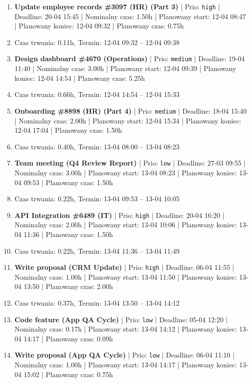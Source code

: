{\begin{enumerate}
  \item [\textbf{14621}] \textbf{Update employee records \#3097 (HR) (Part 3)} | Prio: \texttt{high} | Deadline: 20-04 15:45 | Nominalny czas: 1.50h | Planowany start: 12-04 08:47 | Planowany koniec: 12-04 09:32 | Planowany czas: 0.75h
  \item [\textbf{PRZERWA}] Czas trwania: 0.11h, Termin: 12-04 09:32 -- 12-04 09:38
  \item [\textbf{14676}] \textbf{Design dashboard \#4670 (Operations)} | Prio: \texttt{medium} | Deadline: 19-04 11:40 | Nominalny czas: 3.00h | Planowany start: 12-04 09:39 | Planowany koniec: 12-04 14:54 | Planowany czas: 5.25h
  \item [\textbf{PRZERWA}] Czas trwania: 0.66h, Termin: 12-04 14:54 -- 12-04 15:33
  \item [\textbf{14636}] \textbf{Onboarding \#8898 (HR) (Part 4)} | Prio: \texttt{medium} | Deadline: 18-04 15:40 | Nominalny czas: 2.00h | Planowany start: 12-04 15:34 | Planowany koniec: 12-04 17:04 | Planowany czas: 1.50h
  \item [\textbf{PRZERWA}] Czas trwania: 0.40h, Termin: 13-04 08:00 -- 13-04 08:23
  \item [\textbf{14682}] \textbf{Team meeting (Q4 Review Report)} | Prio: \texttt{low} | Deadline: 27-03 09:55 | Nominalny czas: 3.00h | Planowany start: 13-04 08:23 | Planowany koniec: 13-04 09:53 | Planowany czas: 1.50h
  \item [\textbf{PRZERWA}] Czas trwania: 0.22h, Termin: 13-04 09:53 -- 13-04 10:05
  \item [\textbf{14620}] \textbf{API Integration \#6489 (IT)} | Prio: \texttt{high} | Deadline: 20-04 16:20 | Nominalny czas: 2.00h | Planowany start: 13-04 10:06 | Planowany koniec: 13-04 11:36 | Planowany czas: 1.50h
  \item [\textbf{PRZERWA}] Czas trwania: 0.22h, Termin: 13-04 11:36 -- 13-04 11:49
  \item [\textbf{14629}] \textbf{Write proposal (CRM Update)} | Prio: \texttt{high} | Deadline: 06-04 11:55 | Nominalny czas: 1.00h | Planowany start: 13-04 11:50 | Planowany koniec: 13-04 13:50 | Planowany czas: 2.00h
  \item [\textbf{PRZERWA}] Czas trwania: 0.37h, Termin: 13-04 13:50 -- 13-04 14:12
  \item [\textbf{14703}] \textbf{Code feature (App QA Cycle)} | Prio: \texttt{low} | Deadline: 05-04 12:20 | Nominalny czas: 0.17h | Planowany start: 13-04 14:12 | Planowany koniec: 13-04 14:17 | Planowany czas: 0.09h
  \item [\textbf{14695}] \textbf{Write proposal (App QA Cycle)} | Prio: \texttt{low} | Deadline: 06-04 11:10 | Nominalny czas: 1.00h | Planowany start: 13-04 14:17 | Planowany koniec: 13-04 15:02 | Planowany czas: 0.75h

\end{enumerate}}

